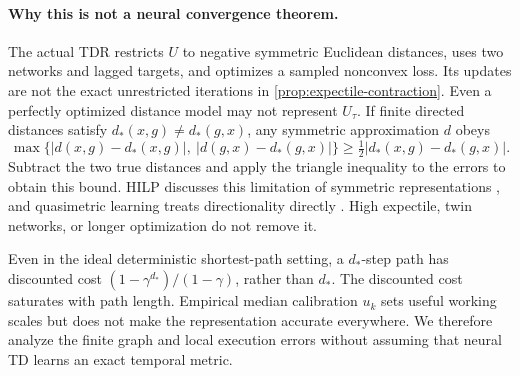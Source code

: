 \documentclass{article} %
\theoremstyle{definition}
\theoremstyle{remark}
\begin{document}
\paragraph{Why this is not a neural convergence theorem.}
The actual TDR restricts $U$ to negative symmetric Euclidean distances, uses two
networks and lagged targets, and optimizes a sampled nonconvex loss.
Its updates are not the exact unrestricted iterations in
\cref{prop:expectile-contraction}. Even a perfectly optimized distance model may not
represent $U_\tau$. If finite directed distances satisfy
$d_*(x,g)\ne d_*(g,x)$, any symmetric approximation $d$ obeys
\[
 \max\{|d(x,g)-d_*(x,g)|,\ |d(g,x)-d_*(g,x)|\}
 \ge\tfrac12|d_*(x,g)-d_*(g,x)| .
\]
Subtract the two true distances and apply the triangle inequality to the errors to obtain
this bound. HILP discusses this limitation of symmetric representations \citep{hilp},
and quasimetric learning treats directionality directly \citep{qrl}.
High expectile, twin networks, or longer optimization do not remove it.

Even in the ideal deterministic shortest-path setting, a $d_*$-step path has discounted
cost $(1-\gamma^{d_*})/(1-\gamma)$, rather than $d_*$.
The discounted cost saturates with path length. Empirical median calibration
$u_k$ sets useful working scales but does not make the representation accurate everywhere.
We therefore analyze the finite graph and local execution errors without assuming
that neural TD learns an exact temporal metric.
\end{document}
